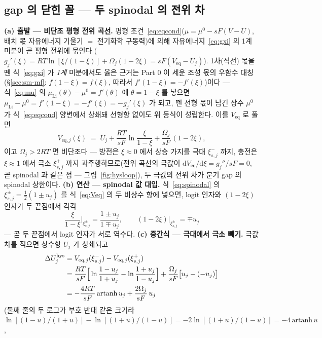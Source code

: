 \documentclass[11pt,a4paper]{article}
\newcommand{\dd}{\mathrm{d}}
\newcommand{\eq}{\mathrm{eq}}
\newcommand{\hys}{\mathrm{hys}}
\begin{document}
\subsection{gap 의 닫힌 꼴 — 두 spinodal 의 전위 차}
\textbf{(a) 출발 — 비단조 평형 전위 곡선.} 평형 조건~\eqref{eq:eqcond}($\mu=\mu^0-sF(V-U)$, 배치 몫 자유에너지 기울기 $=$ 전기화학 구동력)에 의해 자유에너지~\eqref{eq:gxi} 의 1계 미분이 곧 평형 전위에 묶인다
($g_j'(\xi)=RT\ln[\xi/(1-\xi)]+\Omega_j(1-2\xi)=sF(V_\eq-U_j)$). 1차(직선) 몫을 뗀 식~\eqref{eq:gxi} 가 \emph{1계} 미분에서도
옳은 근거는 Part 0 이 세운 조성 몫의 우함수 대칭(\S\ref{sec:sm-mf}: $f(1-\xi)=f(\xi)$, 따라서 $f'(1-\xi)=-f'(\xi)$)이다
— 식~\eqref{eq:mu} 의 $\mu_\mathrm{Li}(\theta)-\mu^0=f'(\theta)$
에 $\theta=1-\xi$ 를 넣으면 $\mu_\mathrm{Li}-\mu^0=f'(1-\xi)=-f'(\xi)=-g_j'(\xi)$ 가 되고, 뗀 선형 몫이 남긴 상수 $\mu^0$ 가
식~\eqref{eq:eqcond} 양변에서 상쇄돼 선형항 없이도 위 등식이 성립한다. 이를 $V_\eq$ 로 풀면
\begin{equation}
V_{\eq,j}(\xi)\;=\;U_j+\frac{RT}{sF}\ln\frac{\xi}{1-\xi}+\frac{\Omega_j}{sF}\,(1-2\xi),
\label{eq:Veq}
\end{equation}
이고 $\Omega_j>2RT$ 면 비단조다 — 방전은 $\xi\!\approx\!0$ 에서 상승 가지를 극대 $\xi_{s,j}^-$ 까지, 충전은 $\xi\!\approx\!1$
에서 극소 $\xi_{s,j}^+$ 까지 과주행하므로(전위 곡선의 극값이 $\dd V_\eq/\dd\xi=g_j''/sF=0$, 곧 spinodal 과 같은 점 —
그림~\ref{fig:hysloop}), 두 극값의 전위 차가 분기 gap 의 spinodal 상한이다. \textbf{(b) 연산 — spinodal 값 대입.}
식~\eqref{eq:spinodal} 의 $\xi_{s,j}^\pm=\tfrac12(1\pm u_j)$ 를 식~\eqref{eq:Veq} 의 두 비상수 항에 넣으면, logit 인자와
$(1-2\xi)$ 인자가 두 끝점에서 각각
\begin{equation}
\frac{\xi}{1-\xi}\bigg|_{\xi_{s,j}^\pm}=\frac{1\pm u_j}{1\mp u_j},
\qquad
(1-2\xi)\big|_{\xi_{s,j}^\pm}=\mp u_j
\label{eq:hyssub}
\end{equation}
— 곧 두 끝점에서 logit 인자가 서로 역수다. \textbf{(c) 중간식 — 극대에서 극소 빼기.} 극값 차를 적으면 상수항 $U_j$ 가
상쇄되고
\begin{align}
\Delta U_j^\hys
&=V_{\eq,j}(\xi_{s,j}^-)-V_{\eq,j}(\xi_{s,j}^+)\notag\\
&=\frac{RT}{sF}\Big[\ln\frac{1-u_j}{1+u_j}-\ln\frac{1+u_j}{1-u_j}\Big]
+\frac{\Omega_j}{sF}\big[u_j-(-u_j)\big]\notag\\
&=-\frac{4RT}{sF}\,\mathrm{artanh}\,u_j+\frac{2\Omega_j}{sF}\,u_j
\label{eq:hysdiff}
\end{align}
(둘째 줄의 두 로그가 부호 반대 같은 크기라 $\ln[(1-u)/(1+u)]-\ln[(1+u)/(1-u)]=-2\ln[(1+u)/(1-u)]=-4\,\mathrm{artanh}\,u$,
\end{document}

